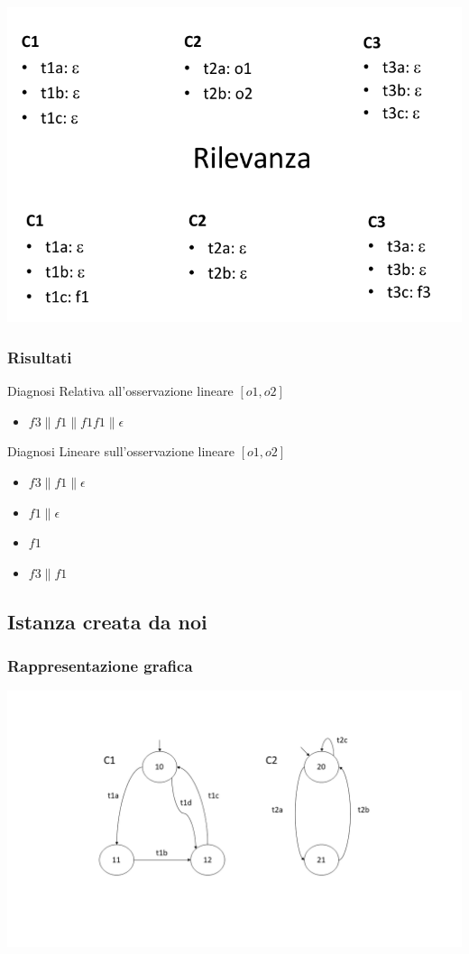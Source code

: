\includegraphics[width=\textwidth]{immagini/c4.png}

\subsubsection{Risultati}
Diagnosi Relativa all'osservazione lineare $[o1, o2]$
\begin{itemize}
    \item  $f3\|f1\|f1f1\|\epsilon$
\end{itemize}
Diagnosi Lineare sull'osservazione lineare $[o1, o2]$
\begin{itemize}
    \item $f3\|f1\|\epsilon$
    \item $f1\|\epsilon$
    \item $f1$
    \item $f3\|f1$
\end{itemize}

\subsection{Istanza creata da noi}
\subsubsection{Rappresentazione grafica}
\includegraphics[width=\textwidth]{immagini/customFA.png}


